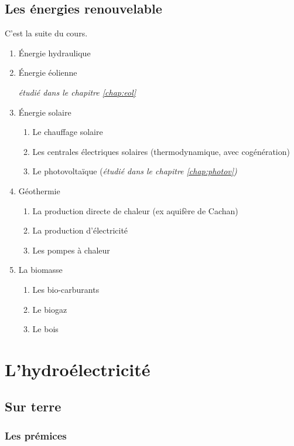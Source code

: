 \documentclass[main.tex]{subfiles}
\begin{document}
\subsection{Les énergies renouvelable}
C'est la suite du cours.
\begin{enumerate}
\item Énergie hydraulique

\item Énergie éolienne

  \emph{étudié dans le chapitre \ref{chap:eol}}

\item Énergie solaire
  \begin{enumerate}[label=\alph*)]
  \item Le chauffage solaire
  \item Les centrales électriques solaires (thermodynamique, avec cogénération)
  \item Le photovoltaïque (\emph{étudié dans le chapitre \ref{chap:photov})}
  \end{enumerate}

\item Géothermie

  \begin{enumerate}[label=\alph*)]
  \item La production directe de chaleur (ex aquifère de Cachan)
  \item La production d'électricité
  \item Les pompes à chaleur
  \end{enumerate}

\item{La biomasse}

  \begin{enumerate}[label=\alph*)]
  \item Les bio-carburants
  \item Le biogaz
  \item Le bois
  \end{enumerate}
\end{enumerate}

\section{L'hydroélectricité}
\subsection{Sur terre}

\subsubsection{Les prémices}
\end{document}
